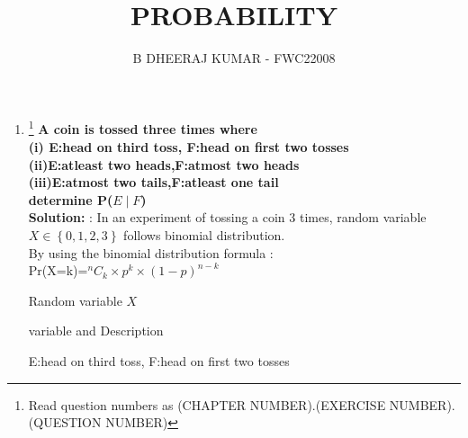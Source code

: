 \documentclass{article}
\providecommand{\cbrak}[1]{\ensuremath{\left\{#1\right\}}}
\newcommand{\solution}{\noindent \textbf{Solution: }}
\begin{document}
\title{PROBABILITY}
\author{\Large B DHEERAJ KUMAR - FWC22008}
\date{}

\maketitle
\begin{enumerate}[label=13.\arabic{enumi}.\arabic{enumii}]%
\setcounter{enumi}{0}
\setcounter{enumii}{6}

\item \footnote{Read question numbers as (CHAPTER NUMBER).(EXERCISE NUMBER).(QUESTION NUMBER)}
\textbf {A coin is tossed three times where \\
(i) E:head on third toss, F:head on first two tosses\\
(ii)E:atleast two heads,F:atmost two heads\\
(iii)E:atmost two tails,F:atleast one tail\\
determine P($E \mid F$) }\\[1ex]
\solution:
In an experiment of tossing a coin 3 times, random variable $X \in \cbrak{0,1,2,3}$ follows binomial distribution.\\
By using the binomial distribution formula :\\
Pr(X=k)=$^{n}C_k \times p^k \times (1-p)^{n-k}$\\
\vspace{5mm}
\begin{table}[h]
\centering

\caption{Random variable $X$}
\label{tab:5} 
\end{table}
\begin{table}[h]
\centering
	
\caption{variable and Description}
\label{tab:2} 
\end{table}
\begin{table}[h]
\centering

	 \caption{E:head on third toss, F:head on first two tosses}
	 \label{tab:2}   
\end{table}


\end{enumerate}
\end{document}
